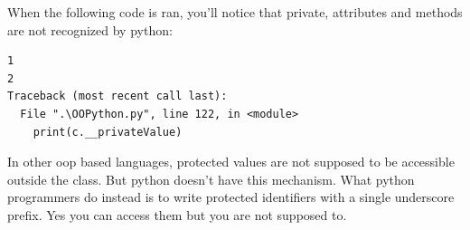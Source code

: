 \begin{Shaded}
\begin{Highlighting}[]
     \NormalTok{(}\NormalTok{):}
        \OperatorTok{=}
        \OperatorTok{=}
        \OperatorTok{=}


    \NormalTok{):}
        \NormalTok{(}\NormalTok{)}
        \NormalTok{(}
        \NormalTok{(}
        \NormalTok{(}

    \NormalTok{):}
        \NormalTok{(}\NormalTok{)}

    \NormalTok{):}
        \NormalTok{(}\NormalTok{)}
\end{Highlighting}
\end{Shaded}

When the following code is ran, you'll notice that private, attributes
and methods are not recognized by python:

\begin{Shaded}
\begin{Highlighting}[]
\end{Highlighting}
\end{Shaded}

\begin{verbatim}
1
2
Traceback (most recent call last):
  File ".\OOPython.py", line 122, in <module>
    print(c.__privateValue)
\end{verbatim}

In other oop based languages, protected values are not supposed to be
accessible outside the class. But python doesn't have this mechanism.
What python programmers do instead is to write protected identifiers
with a single underscore prefix. Yes you can access them but you are not
supposed to.

